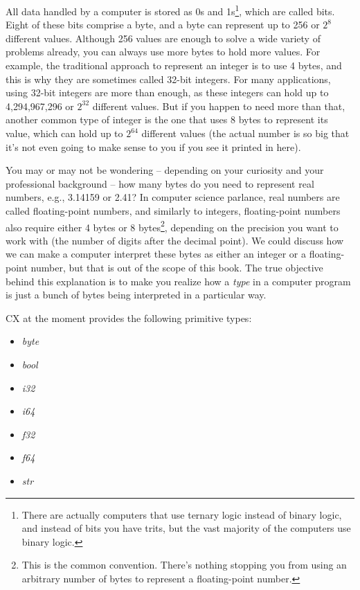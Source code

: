 \documentclass[11pt,fleqn,openany]{book} %
\begin{document}
All data handled by a computer is stored as 0s and 1s\footnote{There are actually computers that use ternary logic instead of binary logic, and instead of bits you have trits, but the vast majority of the computers use binary logic.}, which are called bits. Eight of these bits comprise a byte, and a byte can represent up to 256 or $2^8$ different values. Although 256 values are enough to solve a wide variety of problems already, you can always use more bytes to hold more values. For example, the traditional approach to represent an integer is to use 4 bytes, and this is why they are sometimes called 32-bit integers. For many applications, using 32-bit integers are more than enough, as these integers can hold up to 4,294,967,296 or $2^{32}$ different values. But if you happen to need more than that, another common type of integer is the one that uses 8 bytes to represent its value, which can hold up to $2^{64}$ different values (the actual number is so big that it's not even going to make sense to you if you see it printed in here).

You may or may not be wondering -- depending on your curiosity and your professional background -- how many bytes do you need to represent real numbers, e.g., 3.14159 or 2.41? In computer science parlance, real numbers are called floating-point numbers, and similarly to integers, floating-point numbers also require either 4 bytes or 8 bytes\footnote{This is the common convention. There's nothing stopping you from using an arbitrary number of bytes to represent a floating-point number.}, depending on the precision you want to work with (the number of digits after the decimal point). We could discuss how we can make a computer interpret these bytes as either an integer or a floating-point number, but that is out of the scope of this book. The true objective behind this explanation is to make you realize how a \emph{type} in a computer program is just a bunch of bytes being interpreted in a particular way.

CX at the moment provides the following primitive types:
\begin{itemize}
    \item \textit{byte}
    \item \textit{bool}
    \item \textit{i32}
    \item \textit{i64}
    \item \textit{f32}
    \item \textit{f64}
    \item \textit{str}
\end{itemize}
\end{document}
